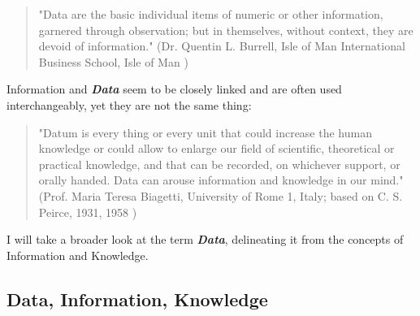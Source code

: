 \documentclass[a4paper,english,twoside,BCOR1.5cm,headsepline,DIV12,appendixprefix,final,12pt]{scrbook}
\newcommand{\important}[1]{\textbf{\textit{#1}}}
\begin{document}
\begin{quote}
"Data are the basic individual items of numeric or other information,
garnered through observation; but in themselves,
without context, they are devoid of information."
(Dr. Quentin L. Burrell, Isle of Man International Business School, Isle of Man \cite{Zins2007})
\end{quote}

Information and \important{Data} seem to be closely linked and are often used interchangeably, yet they are not the same thing:




\begin{quote}
"Datum is every thing or every unit that could increase the
human knowledge or could allow to enlarge our field of scientific,
theoretical or practical knowledge, and that can be
recorded, on whichever support, or orally handed. Data can
arouse information and knowledge in our mind." (Prof. Maria Teresa Biagetti, University of Rome 1, Italy; based on C. S. Peirce, 1931,
1958 \cite{Zins2007})
\end{quote}

I will take a broader look at the term \important{Data}, delineating it from the concepts of Information and Knowledge.

\subsection{Data, Information, Knowledge}
\label{sec:kids}
\end{document}
